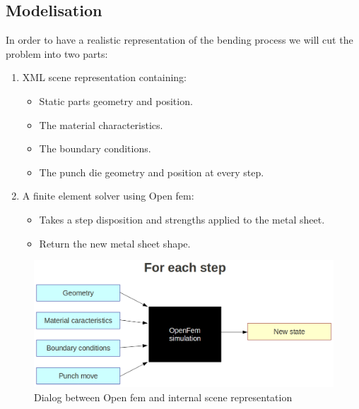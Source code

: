 \documentclass{beamer}
\begin{document}
\subsection{Modelisation}
\begin{frame}
    In order to have a realistic representation of the bending process we will cut the problem into two parts:
    \begin{enumerate}
        \item XML scene representation containing:
            \begin{itemize}
                \item Static parts geometry and position.
                \item The material characteristics.
                \item The boundary conditions.
                \item The punch die geometry and position at every step.
            \end{itemize}
        \item A finite element solver using Open fem:
            \begin{itemize}
                \item Takes a step disposition and strengths applied to the metal sheet.
                \item Return the new metal sheet shape.
            \end{itemize}
    \end{enumerate}
\end{frame}
\begin{frame}
    \begin{figure}
        \includegraphics[width=\textwidth]{img/openFem.png}
        \caption{Dialog between Open fem and internal scene representation}
    \end{figure}
\end{frame}
\end{document}
